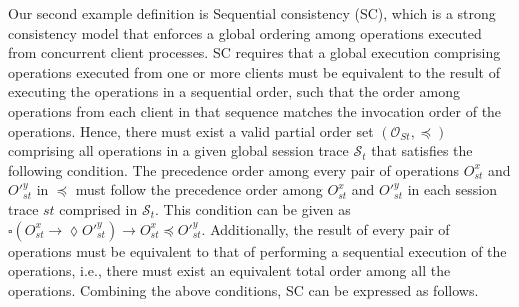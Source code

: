\documentclass[journal, compsoc]{IEEEtran}
\begin{document}
	Our second example definition is  Sequential consistency (SC), which is a strong consistency model that enforces a global ordering among operations executed from concurrent client processes. SC requires that a global execution comprising operations executed from one or more clients must be equivalent to the result of executing the operations in a sequential order, such that the order among operations from each client in that sequence matches the invocation order of the operations.  Hence, there must exist a valid partial order set $\left( {\mathcal{O}_{St}}, \preccurlyeq \right)$ comprising all operations in a given global session trace $\mathcal{S}_t$ that satisfies the following condition. The precedence order among every pair of operations $O^{x}_\mathit{st} $ and $O'^{y}_\mathit{st} $ in  $ \preccurlyeq$ must follow the  precedence order among $O^{x}_\mathit{st} $ and $O'^{y}_\mathit{st} $ in each session trace $\mathit{st}$ comprised in  $\mathcal{S}_t$.  This condition can be given as $\square \left( O_\mathit{st}^x \rightarrow \lozenge O'^{y}_\mathit{st}  \right)
	\rightarrow O_\mathit{st}^x \preccurlyeq O'^{y}_\mathit{st}$. Additionally, the result of every pair of operations must be equivalent to that of performing a sequential execution of the operations, i.e., there must exist an equivalent total order among all the operations. Combining the above conditions, SC can be expressed as follows.
\end{document}
